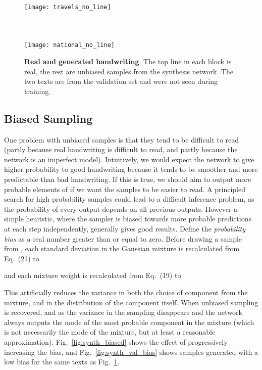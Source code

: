 \documentclass{article}
\newcommand{\flabel}[1]{\label{fig:#1}}
\newcommand{\fref}[1]{Fig.~\ref{fig:#1}}
\begin{document}
\begin{figure}
\texttt{[image: travels\_no\_line]}\\
\\
\\
\\
\texttt{[image: national\_no\_line]}
\\
\caption{\textbf{Real and generated handwriting}. The top line in each block is real, the rest are unbiased samples from the synthesis network. The two texts are from the validation set and were not seen during training.}
\flabel{synth_val}
\end{figure}


\subsection{Biased Sampling}
One problem with unbiased samples is that they tend to be difficult to read (partly because real handwriting is difficult to read, and partly because the network is an imperfect model).
Intuitively, we would expect the network to give higher probability to good handwriting because it tends to be smoother and more predictable than bad handwriting.
If this is true, we should aim to output more probable elements of  if we want the samples to be easier to read. 
A principled search for high probability samples could lead to a difficult inference problem, as the probability of every output depends on all previous outputs.
However a simple heuristic, where the sampler is biased towards more probable predictions at each step independently, generally gives good results.
Define the \emph{probability bias}  as a real number greater than or equal to zero.
Before drawing a sample from , each standard deviation  in the Gaussian mixture is recalculated from Eq.~(21) to 

and each mixture weight is recalculated from Eq.~(19) to

This artificially reduces the variance in both the choice of component from the mixture, and in the distribution of the component itself.
When  unbiased sampling is recovered, and as  the variance in the sampling disappears and the network always outputs the mode of the most probable component in the mixture (which is not necessarily the mode of the mixture, but at least a reasonable approximation).
\fref{synth_biased} shows the effect of progressively increasing the bias, and \fref{synth_val_bias} shows samples generated with a low bias for the same texts as \fref{synth_val}.
\end{document}
